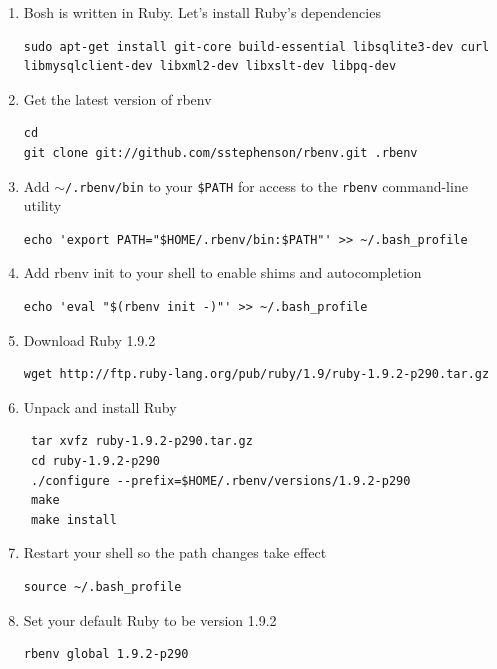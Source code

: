 \begin{enumerate}
\item Bosh is written in Ruby. Let's install Ruby's dependencies

\begin{verbatim}
sudo apt-get install git-core build-essential libsqlite3-dev curl libmysqlclient-dev libxml2-dev libxslt-dev libpq-dev
\end{verbatim}


\item Get the latest version of rbenv

\begin{verbatim}
cd
git clone git://github.com/sstephenson/rbenv.git .rbenv
\end{verbatim}


\item Add \texttt{\ensuremath{\sim}\slash .rbenv\slash bin} to your \texttt{\$PATH} for access to the \texttt{rbenv} command-line utility

\begin{verbatim}
echo 'export PATH="$HOME/.rbenv/bin:$PATH"' >> ~/.bash_profile
\end{verbatim}


\item Add rbenv init to your shell to enable shims and autocompletion

\begin{verbatim}
echo 'eval "$(rbenv init -)"' >> ~/.bash_profile
\end{verbatim}


\item Download Ruby 1.9.2

\begin{verbatim}
wget http://ftp.ruby-lang.org/pub/ruby/1.9/ruby-1.9.2-p290.tar.gz
\end{verbatim}


\item Unpack and install Ruby

\begin{verbatim}
 tar xvfz ruby-1.9.2-p290.tar.gz
 cd ruby-1.9.2-p290
 ./configure --prefix=$HOME/.rbenv/versions/1.9.2-p290
 make
 make install
\end{verbatim}


\item Restart your shell so the path changes take effect

\begin{verbatim}
source ~/.bash_profile
\end{verbatim}


\item Set your default Ruby to be version 1.9.2

\begin{verbatim}
rbenv global 1.9.2-p290
\end{verbatim}


\end{enumerate}

